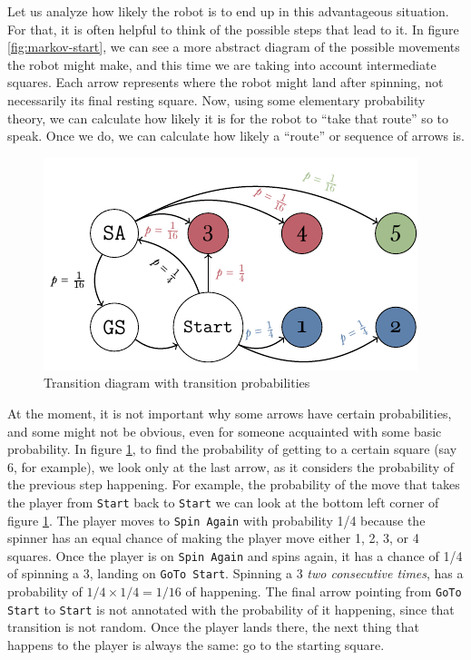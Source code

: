 Let us analyze how likely the robot is to end up in this advantageous situation.
For that, it is often helpful to think of the possible steps that lead to it. In
figure \ref{fig:markov-start}, we can see a more abstract diagram of the
possible movements the robot might make, and this time we are taking into
account intermediate squares. Each arrow represents where the robot might land
after spinning, not necessarily its final resting square. Now, using some
elementary probability theory, we can calculate how likely it is for the robot
to ``take that route'' so to speak. Once we do, we can calculate how likely a
``route'' or sequence of arrows is.

\begin{figure}[h]
	\centering
	\includegraphics[width=\textwidth]{img/transicion-markov.pdf}
	\caption{Transition diagram with transition probabilities}
	\label{fig:annotated-markov-start}
\end{figure}

At the moment, it is not important why some arrows have certain probabilities,
and some might not be obvious, even for someone acquainted with some basic
probability. In figure \ref{fig:annotated-markov-start}, to find the probability
of getting to a certain square (say 6, for example), we look only at the last
arrow, as it considers the probability of the previous step happening. For
example, the probability of the move that takes the player from \texttt{Start}
back to \texttt{Start} we can look at the bottom left corner of figure
\ref{fig:annotated-markov-start}. The player moves to \texttt{Spin Again} with
probability 1/4 because the spinner has an equal chance of making the player
move either 1, 2, 3, or 4 squares. Once the player is on \texttt{Spin Again} and
spins again, it has a chance of 1/4 of spinning a 3, landing on \texttt{GoTo
Start}. Spinning a 3 \textit{two consecutive times}, has a probability of $1/4
\times 1/4 = 1/16$ of happening. The final arrow pointing from \texttt{GoTo
Start} to \texttt{Start} is not annotated with the probability of it happening,
since that transition is not random. Once the player lands there, the next thing
that happens to the player is always the same: go to the starting square.

